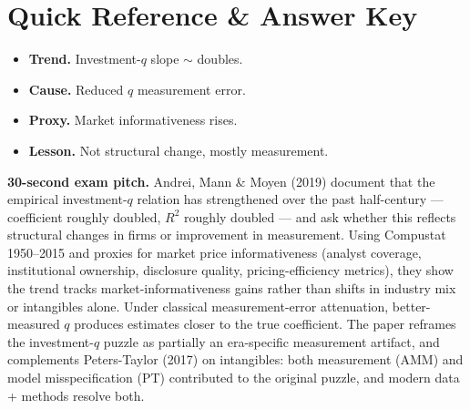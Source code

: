 \documentclass[11pt]{article}
\begin{document}
\section*{Quick Reference \& Answer Key}
\begin{answerbox}
\begin{itemize}
\item \textbf{Trend.} Investment-$q$ slope $\sim$ doubles.
\item \textbf{Cause.} Reduced $q$ measurement error.
\item \textbf{Proxy.} Market informativeness rises.
\item \textbf{Lesson.} Not structural change, mostly measurement.
\end{itemize}
\end{answerbox}

\begin{keybox}
\textbf{30-second exam pitch.} Andrei, Mann \& Moyen (2019) document that the empirical investment-$q$ relation has strengthened over the past half-century --- coefficient roughly doubled, $R^2$ roughly doubled --- and ask whether this reflects structural changes in firms or improvement in measurement. Using Compustat 1950--2015 and proxies for market price informativeness (analyst coverage, institutional ownership, disclosure quality, pricing-efficiency metrics), they show the trend tracks market-informativeness gains rather than shifts in industry mix or intangibles alone. Under classical measurement-error attenuation, better-measured $q$ produces estimates closer to the true coefficient. The paper reframes the investment-$q$ puzzle as partially an era-specific measurement artifact, and complements Peters-Taylor (2017) on intangibles: both measurement (AMM) and model misspecification (PT) contributed to the original puzzle, and modern data + methods resolve both.
\end{keybox}
\end{document}
